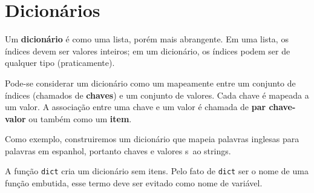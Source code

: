 
\chapter{Dicionários}



Um {\bf dicionário} é como uma lista, porém mais abrangente.  Em uma lista,
os índices devem ser valores inteiros; em um dicionário,
os índices podem ser de qualquer tipo (praticamente).

Pode-se considerar um dicionário como um mapeamente entre um conjunto de
índices (chamados de {\bf chaves}) e um conjunto de valores. Cada chave é
mapeada a um valor. A associação entre uma chave e um valor é chamada de
{\bf par chave-valor} ou também como um {\bf item}.

Como exemplo, construiremos um dicionário que mapeia palavras inglesas para
palavras em espanhol, portanto chaves e valores s~ao strings.

A função {\tt dict} cria um dicionário sem itens. Pelo fato de {\tt dict} ser o
nome de uma função embutida, esse termo deve ser evitado como nome de variável.


